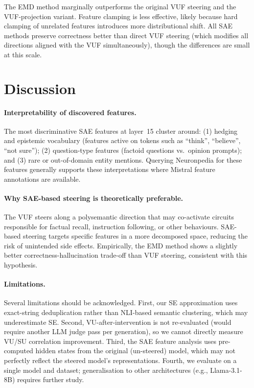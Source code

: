 \documentclass{article}
\begin{document}
The EMD method marginally outperforms the original VUF steering and the
VUF-projection variant.  Feature clamping is less effective, likely because
hard clamping of unrelated features introduces more distributional shift.
All SAE methods preserve correctness better than direct VUF steering (which
modifies all directions aligned with the VUF simultaneously), though the
differences are small at this scale.

\section{Discussion}
\label{sec:discussion}

\paragraph{Interpretability of discovered features.}
The most discriminative SAE features at layer~15 cluster around: (1) hedging
and epistemic vocabulary (features active on tokens such as ``think'',
``believe'', ``not sure''); (2) question-type features (factoid questions vs.\
opinion prompts); and (3) rare or out-of-domain entity mentions.  Querying
Neuronpedia \citep{neuronpedia} for these features generally supports these
interpretations where Mistral feature annotations are available.

\paragraph{Why SAE-based steering is theoretically preferable.}
The VUF steers along a polysemantic direction that may co-activate circuits
responsible for factual recall, instruction following, or other behaviours.
SAE-based steering targets specific features in a more decomposed space,
reducing the risk of unintended side effects.  Empirically, the EMD method
shows a slightly better correctness-hallucination trade-off than VUF steering,
consistent with this hypothesis.

\paragraph{Limitations.}
Several limitations should be acknowledged.  First, our SE approximation uses
exact-string deduplication rather than NLI-based semantic clustering, which may
underestimate SE.  Second, VU-after-intervention is not re-evaluated (would
require another LLM judge pass per generation), so we cannot directly measure
VU/SU correlation improvement.  Third, the SAE feature analysis uses
pre-computed hidden states from the original (un-steered) model, which may not
perfectly reflect the steered model's representations.  Fourth, we evaluate on
a single model and dataset; generalisation to other architectures (e.g.,
Llama-3.1-8B) requires further study.
\end{document}
